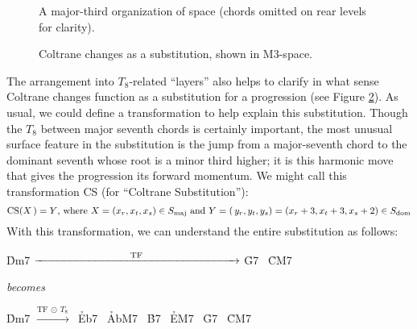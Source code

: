 \begin{figure}[tbp]
  \caption[A major-third organization of \tf space.]{A major-third
    organization of \tf space (\ii chords omitted on rear levels for clarity).}
\label{maj3:maj3-space}
\end{figure}

\begin{figure}[tbp]
  \caption{Coltrane changes as a \tfo substitution, shown in M3-space.}
\label{maj3:coltrane-subs-space}
\end{figure}

The arrangement into $T_8$-related ``layers'' also helps to clarify in what
sense Coltrane changes function as a substitution for a \tfo progression
(see Figure \ref{maj3:coltrane-subs-space}). As usual, we could define a
transformation to help explain this substitution. Though the $T_8$ between
major seventh chords is certainly important, the most unusual surface feature
in the substitution is the jump from a major-seventh chord to the dominant
seventh whose root is a minor third higher; it is this harmonic move that
gives the progression its forward momentum. We might call this transformation
CS (for ``Coltrane Substitution''):%
%
\begin{displaymath}
    \mathrm{CS}(X\,) = Y\text{, where}\ X = (x_r, x_t, x_s) \in S_{\mathrm{maj}}
    \text{ and}\
    Y = (\,y_r, y_t, y_s) = (x_r + 3, x_t + 3, x_s + 2) \in S_{\mathrm{dom}}
\end{displaymath}%
%
With this transformation, we can understand the entire \tfo substitution
as follows:%
%
\begin{center}
  \h{Dm7}  $\xrightarrow{\hspace{8.25em}\mathrm{TF}\hspace{8.25em}}$ \h{G7} \TFarrow\ \h{CM7}

  \vspace{.5em}
  \emph{becomes}
  \vspace{.5em}

  \h{Dm7}  $\xrightarrow{\mathrm{TF}\ \odot\ T_8\,}$\ \h{Eb7} \TFarrow\
  \h{AbM7} \CSarrow\ \h{B7} \TFarrow\
  \h{EM7}  \CSarrow\ \h{G7} \TFarrow\
  \h{CM7}
\end{center}


